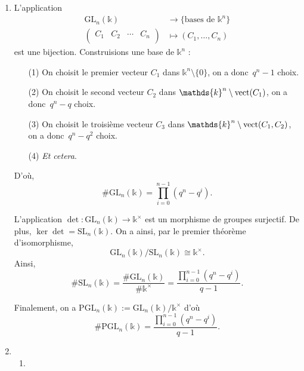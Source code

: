 \documentclass[./main]{subfiles}
\begin{document}
  \begin{enumerate}
    \item L'application \begin{align*}
        \mathrm{GL}_n(\mathds{k}) &\longrightarrow \{\text{bases de } \mathds{k}^n\}  \\
        \begin{pmatrix}
          C_1 & C_2 & \cdots & C_n\\
        \end{pmatrix}  &\longmapsto (C_1, \ldots, C_n)
      \end{align*}
      est une bijection.
      Construisions une base de $\mathds{k}^n$ :
      \begin{enumerate}
        \item[(1)] On choisit le premier vecteur $C_1$ dans $\mathds{k}^n \setminus \{0\}$, on a donc~$q^n - 1$ choix.
        \item[(2)] On choisit le second vecteur $C_2$ dans $\mathds{k}^n \setminus \vect(C_1)$, on a donc~$q^n - q$ choix.
        \item[(3)] On choisit le troisième vecteur $C_3$ dans $\mathds{k}^n \setminus \vect(C_1, C_2)$, on a donc~$q^n - q^2$ choix.
        \item[(4)] \textit{Et cetera}.
      \end{enumerate}
      D'où, \[
      \# \mathrm{GL}_n(\mathds{k}) = \prod_{i=0}^{n-1} (q^n - q^i)
      .\]

      L'application $\det : \mathrm{GL}_n(\mathds{k}) \to \mathds{k}^\times$ est un morphisme de groupes surjectif.
      De plus, $\ker \det = \mathrm{SL}_n(\mathds{k})$. On a ainsi, par le premier théorème d'isomorphisme, \[
        \mathrm{GL}_n(\mathds{k}) / \mathrm{SL}_n(\mathds{k}) \cong \mathds{k}^\times 
      .\]
      Ainsi, \[
      \# \mathrm{SL}_n(\mathds{k}) = \frac{\# \mathrm{GL}_n(\mathds{k})}{\#\mathds{k}^\times} = \frac{\prod_{i=0}^{n-1} (q^n - q^i) }{q-1}
      .\]

      Finalement, on a $\mathrm{PGL}_n(\mathds{k}) := \mathrm{GL}_n(\mathds{k}) / \mathds{k}^\times$ d'où \[
      \# \mathrm{PGL}_n(\mathds{k}) = \frac{\prod_{i=0}^{n-1} (q^n - q^i) }{q-1}
      .\] 
    \item 
      \begin{enumerate}
        \item 
      \end{enumerate}
  \end{enumerate}
\end{document}

